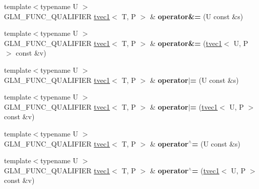 \begin{DoxyCompactItemize}
\item 
{\footnotesize template$<$typename U $>$ }\\G\+L\+M\+\_\+\+F\+U\+N\+C\+\_\+\+Q\+U\+A\+L\+I\+F\+I\+ER \hyperlink{structglm_1_1detail_1_1tvec1}{tvec1}$<$ T, P $>$ \& {\bfseries operator\&=} (U const \&s)\hypertarget{structglm_1_1detail_1_1tvec1_a5b3bbcd03cec59d6a478d7692d6305f6}{}\label{structglm_1_1detail_1_1tvec1_a5b3bbcd03cec59d6a478d7692d6305f6}

\item 
{\footnotesize template$<$typename U $>$ }\\G\+L\+M\+\_\+\+F\+U\+N\+C\+\_\+\+Q\+U\+A\+L\+I\+F\+I\+ER \hyperlink{structglm_1_1detail_1_1tvec1}{tvec1}$<$ T, P $>$ \& {\bfseries operator\&=} (\hyperlink{structglm_1_1detail_1_1tvec1}{tvec1}$<$ U, P $>$ const \&v)\hypertarget{structglm_1_1detail_1_1tvec1_a5917a9ad2db834f02c70970c5aab2fcd}{}\label{structglm_1_1detail_1_1tvec1_a5917a9ad2db834f02c70970c5aab2fcd}

\item 
{\footnotesize template$<$typename U $>$ }\\G\+L\+M\+\_\+\+F\+U\+N\+C\+\_\+\+Q\+U\+A\+L\+I\+F\+I\+ER \hyperlink{structglm_1_1detail_1_1tvec1}{tvec1}$<$ T, P $>$ \& {\bfseries operator$\vert$=} (U const \&s)\hypertarget{structglm_1_1detail_1_1tvec1_ad7e5c9133ebfccdebec443c62e91c61e}{}\label{structglm_1_1detail_1_1tvec1_ad7e5c9133ebfccdebec443c62e91c61e}

\item 
{\footnotesize template$<$typename U $>$ }\\G\+L\+M\+\_\+\+F\+U\+N\+C\+\_\+\+Q\+U\+A\+L\+I\+F\+I\+ER \hyperlink{structglm_1_1detail_1_1tvec1}{tvec1}$<$ T, P $>$ \& {\bfseries operator$\vert$=} (\hyperlink{structglm_1_1detail_1_1tvec1}{tvec1}$<$ U, P $>$ const \&v)\hypertarget{structglm_1_1detail_1_1tvec1_ad91d6098835a4019b008360a48bde0ff}{}\label{structglm_1_1detail_1_1tvec1_ad91d6098835a4019b008360a48bde0ff}

\item 
{\footnotesize template$<$typename U $>$ }\\G\+L\+M\+\_\+\+F\+U\+N\+C\+\_\+\+Q\+U\+A\+L\+I\+F\+I\+ER \hyperlink{structglm_1_1detail_1_1tvec1}{tvec1}$<$ T, P $>$ \& {\bfseries operator$^\wedge$=} (U const \&s)\hypertarget{structglm_1_1detail_1_1tvec1_a72ace2280c4b3e1487a469b652c120cd}{}\label{structglm_1_1detail_1_1tvec1_a72ace2280c4b3e1487a469b652c120cd}

\item 
{\footnotesize template$<$typename U $>$ }\\G\+L\+M\+\_\+\+F\+U\+N\+C\+\_\+\+Q\+U\+A\+L\+I\+F\+I\+ER \hyperlink{structglm_1_1detail_1_1tvec1}{tvec1}$<$ T, P $>$ \& {\bfseries operator$^\wedge$=} (\hyperlink{structglm_1_1detail_1_1tvec1}{tvec1}$<$ U, P $>$ const \&v)\hypertarget{structglm_1_1detail_1_1tvec1_ab48008a42136d1116d006c44cf0a6da1}{}\label{structglm_1_1detail_1_1tvec1_ab48008a42136d1116d006c44cf0a6da1}


\end{DoxyCompactItemize}
